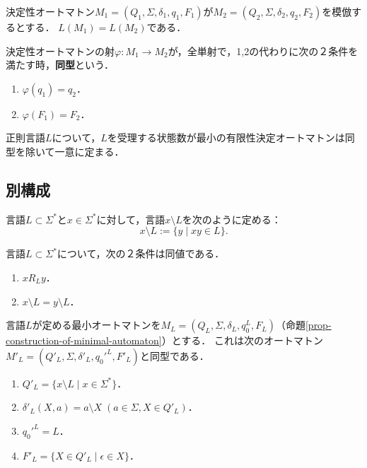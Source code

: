 \documentclass[uplatex, dvipdfmx]{jsreport}
\begin{document}
\begin{proposition}
    決定性オートマトン$M_1=(Q_1,\Sigma,\delta_1,q_1,F_1)$が$M_2=(Q_2,\Sigma,\delta_2,q_2,F_2)$を模倣するとする．
    $L(M_1)=L(M_2)$である．
\end{proposition}

\begin{definition}[isomorphism]
    決定性オートマトンの射$\varphi:M_1\to M_2$が，全単射で，1,2の代わりに次の２条件を満たす時，\textbf{同型}という．
    \begin{enumerate}
        \item $\varphi(q_1)=q_2$．
        \item $\varphi(F_1)=F_2$．
    \end{enumerate}
\end{definition}

\begin{theorem}[最小オートマトンの同型を除いた一意性]
    正則言語$L$について，$L$を受理する状態数が最小の有限性決定オートマトンは同型を除いて一意に定まる．
\end{theorem}

\subsection{別構成}

\begin{definition}
    言語$L\subset\Sigma^*$と$x\in\Sigma^*$に対して，言語$x\setminus L$を次のように定める：
    \[ x\setminus L:=\{y\mid xy\in L\}. \]
\end{definition}

\begin{proposition}
    言語$L\subset\Sigma^*$について，次の２条件は同値である．
    \begin{enumerate}
        \item $xR_Ly$．
        \item $x\setminus L=y\setminus L$．
    \end{enumerate}
\end{proposition}

\begin{theorem}
    言語$L$が定める最小オートマトンを$M_L=(Q_L,\Sigma,\delta_L,q_0^L,F_L)$（命題\ref{prop-construction-of-minimal-automaton}）とする．
    これは次のオートマトン$M'_L=(Q'_L,\Sigma,\delta'_L,q_0'^L,F'_L)$と同型である．
    \begin{enumerate}
        \item $Q'_L=\{x\setminus L\mid x\in\Sigma^*\}$．
        \item $\delta'_L(X,a)=a\setminus X\;(a\in\Sigma,X\in Q'_L)$．
        \item $q_0'^L=L$．
        \item $F'_L=\{X\in Q'_L\mid \epsilon\in X\}$．
    \end{enumerate}
\end{theorem}
\end{document}
